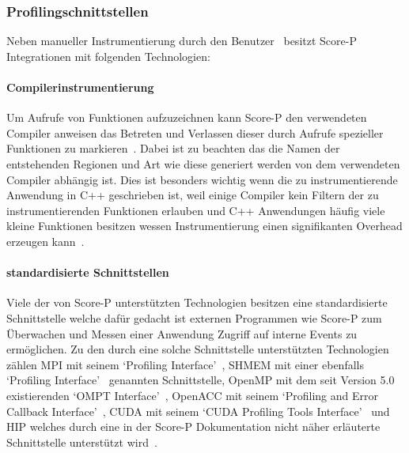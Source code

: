 \documentclass[german,proseminar,hyperref,utf8,lof]{zihpub}
\begin{document}
    \subsubsection{Profilingschnittstellen}
    Neben manueller Instrumentierung durch den Benutzer~
    besitzt Score-P Integrationen mit folgenden Technologien:

    \paragraph{Compilerinstrumentierung}
    Um Aufrufe von Funktionen aufzuzeichnen kann Score-P den verwendeten Compiler
    anweisen das Betreten und Verlassen dieser durch Aufrufe spezieller Funktionen
    zu markieren~.
    Dabei ist zu beachten das die Namen der entstehenden Regionen und Art wie diese generiert
    werden von dem verwendeten Compiler abhängig ist.
    Dies ist besonders wichtig wenn die zu instrumentierende Anwendung in C++ geschrieben ist,
    weil einige Compiler kein Filtern der zu instrumentierenden Funktionen erlauben und C++
    Anwendungen häufig viele kleine Funktionen besitzen wessen Instrumentierung einen signifikanten
    Overhead erzeugen kann~.

    \paragraph{standardisierte Schnittstellen}
    Viele der von Score-P unterstützten Technologien besitzen eine standardisierte Schnittstelle
    welche dafür gedacht ist externen Programmen wie Score-P zum Überwachen und Messen einer Anwendung
    Zugriff auf interne Events zu ermöglichen.
    Zu den durch eine solche Schnittstelle unterstützten Technologien zählen MPI mit seinem
    `Profiling Interface'~, SHMEM mit einer ebenfalls
    `Profiling Interface'~ genannten Schnittstelle, OpenMP mit dem seit
    Version 5.0 existierenden `OMPT Interface'~, OpenACC mit seinem
    `Profiling and Error Callback Interface'~, CUDA mit seinem
    `CUDA Profiling Tools Interface'~ und HIP welches durch eine in der
    Score-P Dokumentation nicht näher erläuterte Schnittstelle unterstützt
    wird~.
\end{document}
